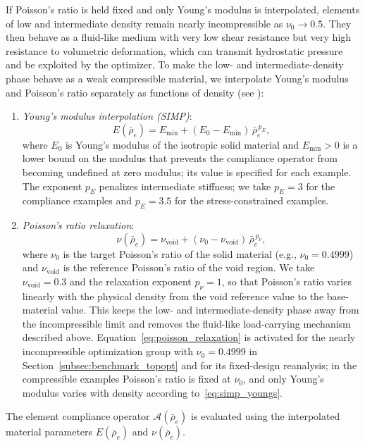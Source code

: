 If Poisson's ratio is held fixed and only Young's modulus is interpolated, elements of low and intermediate density remain nearly incompressible as $\nu_0 \to 0.5$. They then behave as a fluid-like medium with very low shear resistance but very high resistance to volumetric deformation, which can transmit hydrostatic pressure and be exploited by the optimizer. To make the low- and intermediate-density phase behave as a weak compressible material, we interpolate Young's modulus and Poisson's ratio separately as functions of density (see \cite{BruggiVenini2007}):
\begin{enumerate}
\item \emph{Young's modulus interpolation (SIMP)}:
\begin{equation}
\label{eq:simp_youngs}
E(\bar{\rho}_e) = E_{\min} + (E_0 - E_{\min})\, \bar{\rho}_e^{\,p_E},
\end{equation}
where $E_0$ is Young's modulus of the isotropic solid material and $E_{\min} > 0$ is a lower bound on the modulus that prevents the compliance operator from becoming undefined at zero modulus; its value is specified for each example. The exponent $p_E$ penalizes intermediate stiffness; we take $p_E = 3$ for the compliance examples and $p_E = 3.5$ for the stress-constrained examples.
\item \emph{Poisson's ratio relaxation}:
\begin{equation}
\label{eq:poisson_relaxation}
\nu(\bar{\rho}_e) = \nu_{\mathrm{void}} + (\nu_0 - \nu_{\mathrm{void}})\, \bar{\rho}_e^{\,p_\nu},
\end{equation}
where $\nu_0$ is the target Poisson's ratio of the solid material (e.g., $\nu_0 = 0.4999$) and $\nu_{\mathrm{void}}$ is the reference Poisson's ratio of the void region. We take $\nu_{\mathrm{void}} = 0.3$ and the relaxation exponent $p_\nu = 1$, so that Poisson's ratio varies linearly with the physical density from the void reference value to the base-material value. This keeps the low- and intermediate-density phase away from the incompressible limit and removes the fluid-like load-carrying mechanism described above. Equation~\eqref{eq:poisson_relaxation} is activated for the nearly incompressible optimization group with $\nu_0 = 0.4999$ in Section~\ref{subsec:benchmark_topopt} and for its fixed-design reanalysis; in the compressible examples Poisson's ratio is fixed at $\nu_0$, and only Young's modulus varies with density according to~\eqref{eq:simp_youngs}.
\end{enumerate}
The element compliance operator $\mathcal{A}(\bar{\rho}_e)$ is evaluated using the interpolated material parameters $E(\bar{\rho}_e)$ and $\nu(\bar{\rho}_e)$.

